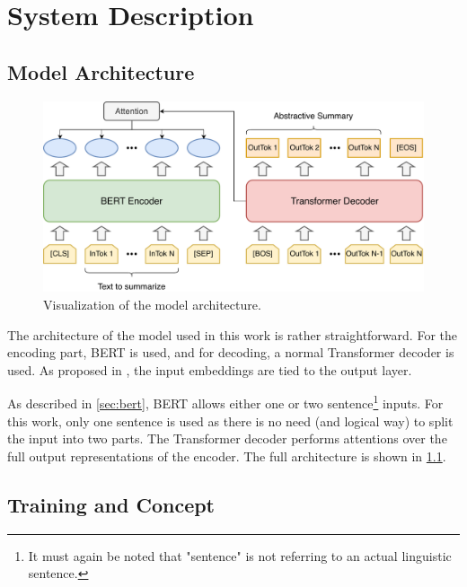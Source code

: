 \chapter{System Description}\label{ch:system-description}



\section{Model Architecture}
 
\begin{figure}[h]
\centering
\includegraphics[width=0.7\paperwidth]{figures/summarization-architecture}
\caption{Visualization of the model architecture.}
\label{fig:summarization-architecture}
\end{figure}

The architecture of the model used in this work is rather straightforward.
For the encoding part, BERT is used, and for decoding, a normal Transformer decoder is used.
As proposed in \cite{1608.05859}, the input embeddings are tied to the output layer.

As described in \cref{sec:bert}, BERT allows either one or two sentence\footnote{It must again be noted that "sentence" is not referring to an actual linguistic sentence.} inputs.
For this work, only one sentence is used as there is no need (and logical way) to split the input into two parts.
The Transformer decoder performs attentions over the full output representations of the encoder.
The full architecture is shown in \cref{fig:summarization-architecture}.


\section{Training and Concept}\label{sec:system-description-training}

